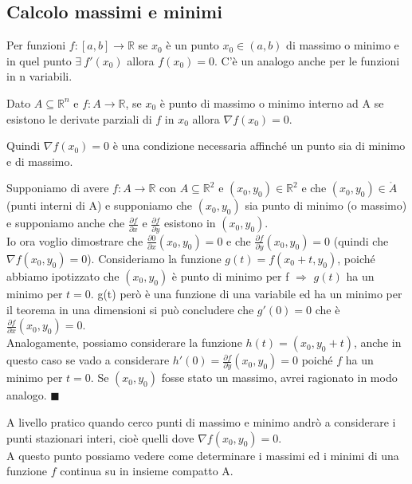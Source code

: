 \subsection{Calcolo massimi e minimi}
Per funzioni $f: [a,b]\to \mathbb{R}$ se $x_0$ è un punto $x_0 \in (a,b)$ di massimo o minimo e in quel punto $\exists \: f'(x_0)$ allora $f(x_0) = 0$. C'è un analogo anche per le funzioni in n variabili.
\begin{theorem}
Dato $A \subseteq \mathbb{R}^n$ e $f: A \to \mathbb{R}$, se $x_0$ è punto di massimo o minimo interno ad A se esistono le derivate parziali di $f$ in $x_0$ allora $\nabla f(x_0) = 0$.
\end{theorem}
\hspace{-15pt}Quindi $\nabla f(x_0) = 0$ è una condizione necessaria affinché un punto sia di minimo e di massimo.
\begin{demostration}
Supponiamo di avere $f: A \to \mathbb{R}$ con $A \subseteq \mathbb{R}^2$ e $(x_0,y_0) \in \mathbb{R}^2$ e che $(x_0,y_0) \in \mathring{A}$ (punti interni di A) e supponiamo che $(x_0,y_0)$ sia punto di minimo (o massimo) e supponiamo anche che $\frac{\partial f}{\partial x}$ e $\frac{\partial f}{\partial y}$ esistono in $(x_0, y_0)$.\\
Io ora voglio dimostrare che $\frac{\partial 0}{\partial x}(x_0, y_0) = 0$ e che $\frac{\partial f}{\partial y}(x_0,y_0) = 0$ (quindi che $\nabla f(x_0,y_0) = 0$). Consideriamo la funzione $g(t) = f(x_0 + t, y_0)$, poiché abbiamo ipotizzato che $(x_0,y_0)$ è punto di minimo per f $\Longrightarrow$ $g(t)$ ha un minimo per $t = 0$. g(t) però è una funzione di una variabile ed ha un minimo per il teorema in una dimensioni si può concludere che $g'(0) = 0$ che è $\frac{\partial f}{\partial x}(x_0,y_0) = 0$.\\
Analogamente, possiamo considerare la funzione $h(t) = (x_0, y_0 + t)$, anche in questo caso se vado a considerare $h'(0) = \frac{\partial f}{\partial y}(x_0, y_0) = 0$ poiché $f$ ha un minimo per $t = 0$. Se $(x_0, y_0)$ fosse stato un massimo, avrei ragionato in modo analogo. $\blacksquare$
\end{demostration}

\hspace{-15pt}A livello pratico quando cerco punti di massimo e minimo andrò a considerare i punti stazionari interi, cioè quelli dove $\nabla f(x_0,y_0) = 0$.\\
A questo punto possiamo vedere come determinare i massimi ed i minimi di una funzione $f$ continua su in insieme compatto A.
